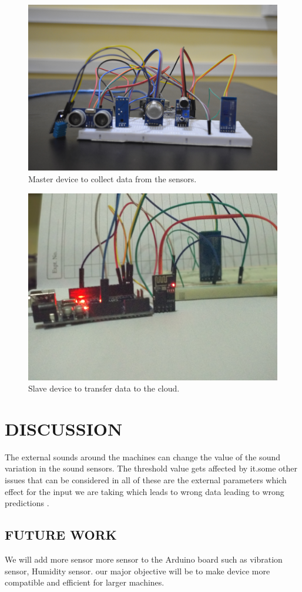 \begin{figure}[h]
\centerline{\includegraphics[width=4.7in]{master2}}
\caption{Master device to collect data from the sensors.}
\end{figure}
\vspace{0.3in}
\begin{figure}[h]
\centerline{\includegraphics[width=4.7in]{slave22}}
\caption{Slave device to transfer data to the cloud.}
\end{figure}
\newpage



\newpage
\section{DISCUSSION}
The external sounds around the machines can change the value of the sound variation in the sound sensors. The threshold value gets affected by it.some other issues that can be considered in all of these are the external parameters which effect for the input we are taking which leads to wrong data leading to wrong predictions .\\
\subsection{FUTURE WORK}
We will add more sensor more sensor to the Arduino board such as vibration sensor, Humidity sensor. our major objective will be to make device more compatible and efficient for larger machines. 